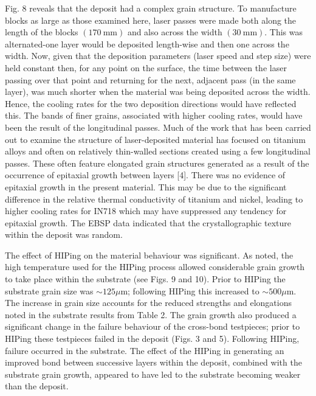 \documentclass[10pt]{article}
\begin{document}
Fig. 8 reveals that the deposit had a complex grain structure. To manufacture blocks as large as those examined here, laser passes were made both along the length of the blocks $(170 \mathrm{~mm})$ and also across the width $(30 \mathrm{~mm})$. This was alternated-one layer would be deposited length-wise and then one across the width. Now, given that the deposition parameters (laser speed and step size) were held constant then, for any point on the surface, the time between the laser passing over that point and returning for the next, adjacent pass (in the same layer), was much shorter when the material was being deposited across the width. Hence, the cooling rates for the two deposition directions would have reflected this. The bands of finer grains, associated with higher cooling rates, would have been the result of the longitudinal passes. Much of the work that has been carried out to examine the structure of laser-deposited material has focused on titanium alloys and often on relatively thin-walled sections created using a few longitudinal passes. These often feature elongated grain structures generated as a result of the occurrence of epitaxial growth between layers [4]. There was no evidence of epitaxial growth in the present material. This may be due to the significant difference in the relative thermal conductivity of titanium and nickel, leading to\\
higher cooling rates for IN718 which may have suppressed any tendency for epitaxial growth. The EBSP data indicated that the crystallographic texture within the deposit was random.

The effect of HIPing on the material behaviour was significant. As noted, the high temperature used for the HIPing process allowed considerable grain growth to take place within the substrate (see Figs. 9 and 10). Prior to HIPing the substrate grain size was $\sim 125 \mu \mathrm{m}$; following HIPing this increased to $\sim 500 \mu \mathrm{m}$. The increase in grain size accounts for the reduced strengths and elongations noted in the substrate results from Table 2. The grain growth also produced a significant change in the failure behaviour of the cross-bond testpieces; prior to HIPing these testpieces failed in the deposit (Figs. 3 and 5). Following HIPing, failure occurred in the substrate. The effect of the HIPing in generating an improved bond between successive layers within the deposit, combined with the substrate grain growth, appeared to have led to the substrate becoming weaker than the deposit.
\end{document}
